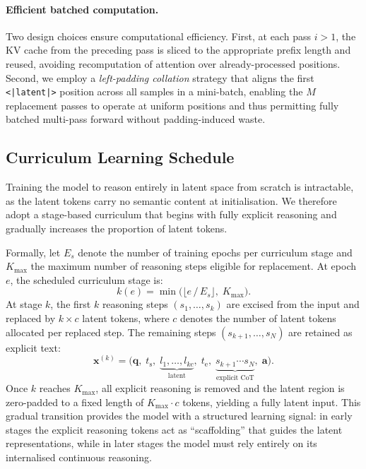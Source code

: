 \paragraph{Efficient batched computation.}
Two design choices ensure computational efficiency.
First, at each pass $i>1$, the KV cache from the preceding pass is sliced
to the appropriate prefix length and reused, avoiding recomputation of
attention over already-processed positions.
Second, we employ a \emph{left-padding collation} strategy that aligns the
first \texttt{<|latent|>} position across all samples in a mini-batch,
enabling the $M$ replacement passes to operate at uniform positions and
thus permitting fully batched multi-pass forward without padding-induced
waste.

\subsection{Curriculum Learning Schedule}
\label{sec:curriculum}

Training the model to reason entirely in latent space from scratch is
intractable, as the latent tokens carry no semantic content at
initialisation.
We therefore adopt a stage-based curriculum that begins with fully explicit
reasoning and gradually increases the proportion of latent tokens.

Formally, let $E_s$ denote the number of training epochs per curriculum
stage and $K_{\max}$ the maximum number of reasoning steps eligible for
replacement.
At epoch $e$, the scheduled curriculum stage is:
%
\begin{equation}
  k(e) = \min\!\Big(\big\lfloor e\,/\,E_s \big\rfloor,\;K_{\max}\Big).
  \label{eq:stage}
\end{equation}
%
At stage $k$, the first $k$ reasoning steps $(s_1,\ldots,s_k)$ are
excised from the input and replaced by $k{\times}c$ latent tokens, where
$c$ denotes the number of latent tokens allocated per replaced step.
The remaining steps $(s_{k+1},\ldots,s_N)$ are retained as explicit text:
%
\begin{equation}
  \mathbf{x}^{(k)}
  = \big(\mathbf{q},\;t_{\mathrm{s}},\;
    \underbrace{l_1,\ldots,l_{kc}}_{\text{latent}},\;
    t_{\mathrm{e}},\;
    \underbrace{s_{k+1}\cdots s_N}_{\text{explicit CoT}},\;
    \mathbf{a}\big).
  \label{eq:curriculum_seq}
\end{equation}
%
Once $k$ reaches $K_{\max}$, all explicit reasoning is removed and the
latent region is zero-padded to a fixed length of $K_{\max}{\cdot}c$
tokens, yielding a fully latent input.
This gradual transition provides the model with a structured learning
signal: in early stages the explicit reasoning tokens act as
``scaffolding'' that guides the latent representations, while in later
stages the model must rely entirely on its internalised continuous
reasoning.

